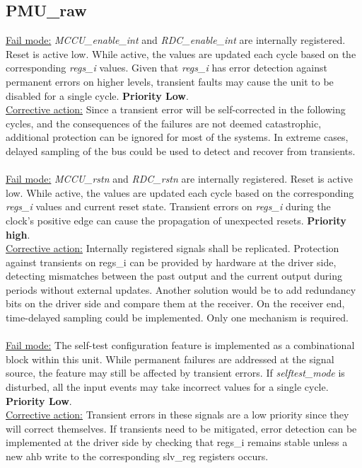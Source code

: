\subsection{PMU\_raw}
\underline{Fail mode:} \textit{MCCU\_enable\_int} and \textit{RDC\_enable\_int} are internally registered. Reset is active low. While active, the values are updated each cycle based on the corresponding \textit{regs\_i} values. Given that \textit{regs\_i} has error detection against permanent errors on higher levels, transient faults may cause the unit to be disabled for a single cycle. \textbf{Priority Low}.\\
\underline{Corrective action:} Since a transient error will be self-corrected in the following cycles, and the consequences of the failures are not deemed catastrophic, additional protection can be ignored for most of the systems. In extreme cases, delayed sampling of the bus could be used to detect and recover from transients.\\
\\
\underline{Fail mode:} \textit{MCCU\_rstn} and \textit{RDC\_rstn} are internally registered. Reset is active low. While active, the values are updated each cycle based on the corresponding \textit{regs\_i} values and current reset state. Transient errors on \textit{regs\_i} during the clock's positive edge can cause the propagation of unexpected resets. \textbf{Priority high}.\\
\underline{Corrective action:} 
Internally registered signals shall be replicated. Protection against transients on regs\_i can be provided by hardware at the driver side, detecting mismatches between the past output and the current output during periods without external updates. Another solution would be to add redundancy bits on the driver side and compare them at the receiver. On the receiver end, time-delayed sampling could be implemented. Only one mechanism is required.\\ 
\\
\underline{Fail mode:} The self-test configuration feature is implemented as a combinational block within this unit. While permanent failures are addressed at the signal source, the feature may still be affected by transient errors. If \textit{selftest\_mode} is disturbed, all the input events may take incorrect values for a single cycle. \textbf{Priority Low}.\\
\underline{Corrective action:}
 Transient errors in these signals are a low priority since they will correct themselves. If transients need to be mitigated, error detection can be implemented at the driver side by checking that regs\_i remains stable unless a new ahb write to the corresponding slv\_reg registers occurs.
